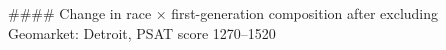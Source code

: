 #### Change in race × first-generation composition after excluding Geomarket: Detroit, PSAT score 1270–1520
